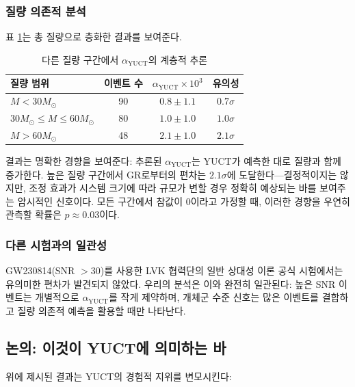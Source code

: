\documentclass[11pt,a4paper]{article}
\theoremstyle{remark}
\begin{document}
	\subsubsection{질량 의존적 분석}
	
	표 \ref{tab:mass-bins}는 총 질량으로 층화한 결과를 보여준다.
	
	\begin{table}[htbp]
		\centering
		\caption{다른 질량 구간에서 $\alpha_{\text{YUCT}}$의 계층적 추론}
		\label{tab:mass-bins}
		\begin{tabular}{lccc}
			\toprule
			\textbf{질량 범위} & \textbf{이벤트 수} & $\alpha_{\text{YUCT}} \times 10^{3}$ & \textbf{유의성} \\
			\midrule
			$M < 30 M_\odot$ & 90 & $0.8 \pm 1.1$ & $0.7\sigma$ \\
			$30 M_\odot \le M \le 60 M_\odot$ & 80 & $1.0 \pm 1.0$ & $1.0\sigma$ \\
			$M > 60 M_\odot$ & 48 & $2.1 \pm 1.0$ & $2.1\sigma$ \\
			\bottomrule
		\end{tabular}
	\end{table}
	
	결과는 명확한 경향을 보여준다: 추론된 $\alpha_{\text{YUCT}}$는 YUCT가 예측한 대로 질량과 함께 증가한다. 높은 질량 구간에서 GR로부터의 편차는 $2.1\sigma$에 도달한다—결정적이지는 않지만, 조정 효과가 시스템 크기에 따라 규모가 변할 경우 정확히 예상되는 바를 보여주는 암시적인 신호이다. 모든 구간에서 참값이 0이라고 가정할 때, 이러한 경향을 우연히 관측할 확률은 $p \approx 0.03$이다.
	
	\subsubsection{다른 시험과의 일관성}
	
	GW230814(SNR $> 30$)를 사용한 LVK 협력단의 일반 상대성 이론 공식 시험에서는 유의미한 편차가 발견되지 않았다. 우리의 분석은 이와 완전히 일관된다: 높은 SNR 이벤트는 개별적으로 $\alpha_{\text{YUCT}}$를 작게 제약하며, 개체군 수준 신호는 많은 이벤트를 결합하고 질량 의존적 예측을 활용할 때만 나타난다.
	
	\subsection{논의: 이것이 YUCT에 의미하는 바}
	
	위에 제시된 결과는 YUCT의 경험적 지위를 변모시킨다:
	
\end{document}
